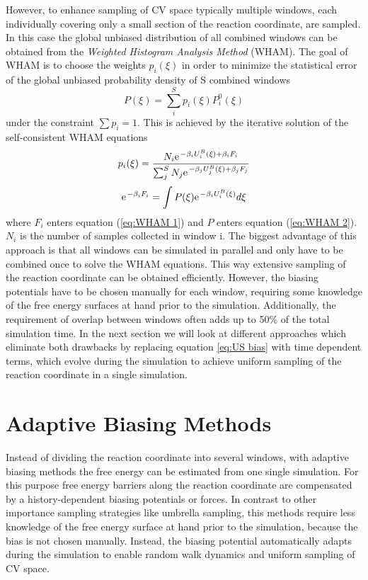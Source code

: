 However, to enhance sampling of CV space typically multiple windows, each individually covering only a small section of the reaction coordinate, are sampled. In this case the global unbiased distribution of all combined windows can be obtained from the \textit{Weighted Histogram Analysis Method} (WHAM).\autocite{kumar1992weighted} The goal of WHAM is to choose the weights $p_i(\xi)$ in order to minimize the statistical error of the global unbiased probability density of S combined windows
\begin{equation}
  P(\xi)=\sum_i^{S} p_i(\xi) P_i^0(\xi)
\end{equation}
under the constraint $\sum p_i = 1$. This is achieved by the iterative solution of the self-consistent WHAM equations
\begin{equation}
  p_i(\xi) = \frac{N_i \e^{-\beta_i U_i^B(\xi)+\beta_i F_i}}{\sum_j^S N_j \e^{-\beta_j U_j^B(\xi)+\beta_j F_j}} \label{eq:WHAM 1}
\end{equation}
\begin{equation}
  \e^{-\beta_i F_i} = \int P(\xi)\e^{-\beta_i U_i^B (\xi)}d\xi
  \label{eq:WHAM 2}
\end{equation}
where $F_i$ enters equation (\ref{eq:WHAM 1}) and $P$ enters equation (\ref{eq:WHAM 2}).\autocite{kastner2011umbrella} $N_i$ is the number of samples collected in window i.
The biggest advantage of this approach is that all windows can be simulated in parallel and only have to be combined once to solve the WHAM equations. This way extensive sampling of the reaction coordinate can be obtained efficiently.
However, the biasing potentials have to be chosen manually for each window, requiring some knowledge of the free energy surfaces at hand prior to the simulation.
Additionally, the requirement of overlap between windows often adds up to 50\% of the total simulation time.\autocite{comer2015adaptive}
In the next section we will look at different approaches which eliminate both drawbacks by replacing equation \ref{eq:US bias} with time dependent terms, which evolve during the simulation to achieve uniform sampling of the reaction coordinate in a single simulation.

\newpage
\section{Adaptive Biasing Methods}
\label{sec:adaptive biasing}

Instead of dividing the reaction coordinate into several windows, with adaptive biasing methods the free energy can be estimated from one single simulation. For this purpose free energy barriers along the reaction coordinate are compensated by a history-dependent biasing potentials or forces. In contrast to other importance sampling strategies like umbrella sampling, this methods require less knowledge of the free energy surface at hand prior to the simulation, because the bias is not chosen manually. Instead, the biasing potential automatically adapts during the simulation to enable random walk dynamics and uniform sampling of CV space.\autocite{comer2015adaptive, barducci2011metadynamics}

